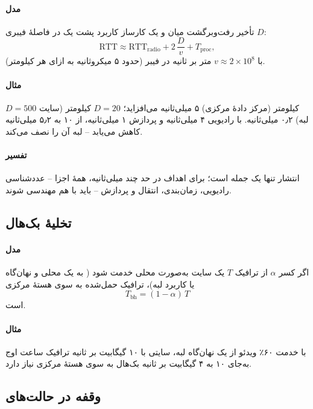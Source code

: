 \documentclass[11pt,a4paper]{article}
\begin{document}
\paragraph{مدل} تأخیر رفت‌وبرگشت میان  و یک کارساز کاربرد پشت یک  در فاصلهٔ فیبری $D$:
\begin{equation}\label{eq:rtt}
  \mathrm{RTT} \approx \mathrm{RTT}_{\mathrm{radio}} + 2\,\frac{D}{v} + T_{\mathrm{proc}},
\end{equation}
با $v \approx 2\times10^8$ متر بر ثانیه در فیبر (حدود ۵ میکروثانیه به ازای هر کیلومتر).
\paragraph{مثال} $D = 500$ کیلومتر (مرکز دادهٔ مرکزی) ۵ میلی‌ثانیه می‌افزاید؛ $D = 20$ کیلومتر (سایت لبه) ۰٫۲ میلی‌ثانیه. با
 رادیویی ۴ میلی‌ثانیه و پردازش ۱ میلی‌ثانیه،  از ۱۰ به ۵٫۲ میلی‌ثانیه کاهش می‌یابد -- لبه آن را نصف می‌کند.
\paragraph{تفسیر} انتشار تنها یک جمله است؛ برای اهداف  در حد چند میلی‌ثانیه، همهٔ اجزا -- عددشناسی رادیویی، زمان‌بندی،
انتقال و پردازش -- باید با هم مهندسی شوند.

\subsection{تخلیهٔ بک‌هال}\label{sec:offload}
\paragraph{مدل} اگر کسر $\alpha$ از ترافیک $T$ یک سایت به‌صورت محلی خدمت شود ( به یک  محلی و نهان‌گاه یا
کاربرد لبه)، ترافیک حمل‌شده به سوی هستهٔ مرکزی
\begin{equation}\label{eq:offload}
  T_{\mathrm{bh}} = (1-\alpha)\,T
\end{equation}
است.
\paragraph{مثال} با خدمت ۶۰٪ ویدئو از یک نهان‌گاه لبه، سایتی با ۱۰ گیگابیت بر ثانیه ترافیک ساعت اوج به‌جای ۱۰ به ۴ گیگابیت بر
ثانیه بک‌هال به سوی هستهٔ مرکزی نیاز دارد.

\subsection{وقفه در حالت‌های }\label{sec:ssc}
\end{document}
